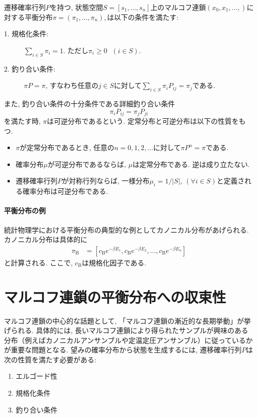 遷移確率行列$P$を持つ, 状態空間$S = [s_{1}, \ldots, s_{n}]$上のマルコフ連鎖$(x_{0}, x_{1},\ldots, )$に対する平衡分布$\pi=(\pi_{1}, \ldots, \pi_{n}),$は以下の条件を満たす:

\begin{description}
    \item[1. 規格化条件:] $\sum_{i \in S} \pi_{i} = 1$. ただし$\pi_{i} \ge 0 ~~~(i \in S)$.
    \item[2. 釣り合い条件:] $\pi P = \pi$, すなわち任意の$j \in S$に対して$\sum_{i \in S} \pi_{i} P_{ij} = \pi_{j}$である.
\end{description}
また, 釣り合い条件の十分条件である詳細釣り合い条件
\begin{equation}
    \pi_{i} P_{ij} = \pi_{j} P_{ji}
\end{equation}
を満たす時, $\pi$は可逆分布であるという.
定常分布と可逆分布は以下の性質をもつ.
\begin{itemize}
    \item $\pi$が定常分布であるとき, 任意の$n = 0, 1, 2,\ldots$に対して$\pi P^{n} = \pi$である.
    \item 確率分布$\mu$が可逆分布であるならば, $\mu$は定常分布である. 逆は成り立たない.
    \item 遷移確率行列$P$が対称行列ならば, 一様分布$\mu_{i} = 1/|S|,~(\forall i \in S)$と定義される確率分布は可逆分布である.
\end{itemize}


\paragraph{平衡分布の例}
統計物理学における平衡分布の典型的な例としてカノニカル分布があげられる.
カノニカル分布は具体的に
\begin{align}
\pi_{\mathrm{B}} &= [c_{\mathrm{B}} e^{-\beta E_{1}}, c_{\mathrm{B}} e^{-\beta E_{2}},\ldots,c_{\mathrm{B}} e^{-\beta E_{n}}]
\end{align}
と計算される. ここで, $c_{\mathrm{B}}$は規格化因子である.


\section{マルコフ連鎖の平衡分布への収束性}
マルコフ連鎖の中心的な話題として, 「マルコフ連鎖の漸近的な長期挙動」が挙げられる.
具体的には, 長いマルコフ連鎖により得られたサンプルが興味のある分布（例えばカノニカルアンサンブルや定温定圧アンサンブル）に従っているかが重要な問題となる.
望みの確率分布から状態を生成するには, 遷移確率行列$P$は次の性質を満たす必要がある:
\begin{enumerate}
    \item エルゴード性
    \item 規格化条件
    \item 釣り合い条件
\end{enumerate}

